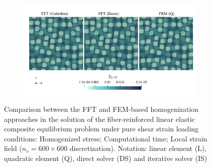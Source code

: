\begin{figure}[hbt]
\begin{subfigure}[b]{0.49\textwidth}
    \caption{}
    \label{subfig:linear_2D_shear_cpu_time_vs_n_voxels}
  \end{subfigure}
  \begin{subfigure}[b]{\textwidth}
    \centering
    \includegraphics[width=\textwidth]{figures/linear_2D_shear_strain_12}
    \caption{}
    \label{subfig:linear_2D_shear_strain_12}
  \end{subfigure}
  \caption{Comparison between the FFT and FEM-based homogenization approaches in the
  solution of the fiber-reinforced linear elastic composite equilibrium problem under pure
  shear strain loading conditions:
   Homogenized stress;
   Computational time;
   Local strain field (\(n_v = 600 \times 600\)
  discretization). Notation: linear element (L), quadratic element (Q), direct solver (DS)
  and iterative solver (IS)}
  \label{fig:linear_2D_shear}
\end{figure}

